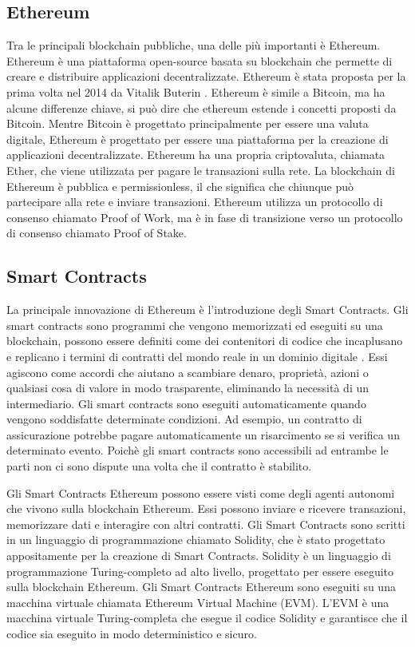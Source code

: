 \documentclass[../../Thesis.tex]{subfiles}
\begin{document}
\subsection{Ethereum}
Tra le principali blockchain pubbliche, una delle più importanti è Ethereum. Ethereum è una piattaforma open-source basata su blockchain che permette di creare e distribuire applicazioni decentralizzate. Ethereum è stata proposta per la prima volta nel 2014 da Vitalik Buterin \cite{Ethereum}. Ethereum è simile a Bitcoin, ma ha alcune differenze chiave, si può dire che ethereum estende i concetti proposti da Bitcoin. Mentre Bitcoin è progettato principalmente per essere una valuta digitale, Ethereum è progettato per essere una piattaforma per la creazione di applicazioni decentralizzate. Ethereum ha una propria criptovaluta, chiamata Ether, che viene utilizzata per pagare le transazioni sulla rete. La blockchain di Ethereum è pubblica e permissionless, il che significa che chiunque può partecipare alla rete e inviare transazioni. Ethereum utilizza un protocollo di consenso chiamato Proof of Work, ma è in fase di transizione verso un protocollo di consenso chiamato Proof of Stake.

\subsection{Smart Contracts}

La principale innovazione di Ethereum è l'introduzione degli Smart Contracts.
Gli smart contracts sono programmi che vengono memorizzati ed eseguiti su una blockchain, possono essere definiti come dei contenitori di codice che incaplusano e replicano i termini di contratti del mondo reale in un dominio digitale \cite{SCReview}. Essi agiscono come accordi  che aiutano a scambiare denaro, proprietà, azioni o qualsiasi cosa di valore in modo trasparente, eliminando la necessità di un intermediario. Gli smart contracts sono eseguiti automaticamente quando vengono soddisfatte determinate condizioni. Ad esempio, un contratto di assicurazione potrebbe pagare automaticamente un risarcimento se si verifica un determinato evento. Poichè gli smart contracts sono accessibili ad entrambe le parti non ci sono dispute una volta che il contratto è stabilito. 

Gli Smart Contracts Ethereum possono essere visti come degli agenti autonomi che vivono sulla blockchain Ethereum. Essi possono inviare e ricevere transazioni, memorizzare dati e interagire con altri contratti. Gli Smart Contracts sono scritti in un linguaggio di programmazione chiamato Solidity, che è stato progettato appositamente per la creazione di Smart Contracts. Solidity è un linguaggio di programmazione Turing-completo ad alto livello, progettato per essere eseguito sulla blockchain Ethereum. Gli Smart Contracts Ethereum sono eseguiti su una macchina virtuale chiamata Ethereum Virtual Machine (EVM). L'EVM è una macchina virtuale Turing-completa che esegue il codice Solidity e garantisce che il codice sia eseguito in modo deterministico e sicuro. 
\end{document}
